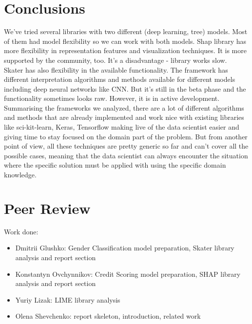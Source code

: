 \section{Conclusions}
We've tried several libraries with two different (deep learning, tree) models. Most of them had model flexibility so we can work with both models. 
Shap library has more flexibility in representation features and visualization techniques. It is more supported by the community, too. It's a disadvantage - library works slow. \\
Skater has also flexibility in the available functionality. The framework has different interpretation algorithms and methods available for different models including deep neural networks like CNN. But it's still in the beta phase and the functionality sometimes looks raw. However, it is in active development.
Summarising the frameworks we analyzed, there are a lot of different algorithms and methods that are already implemented and work nice with existing libraries like sci-kit-learn, Keras, Tensorflow making live of the data scientist easier and giving time to stay focused on the domain part of the problem. But from another point of view, all these techniques are pretty generic so far and can't cover all the possible cases, meaning that the data scientist can always encounter the situation where the specific solution must be applied with using the specific domain knowledge.

\section{Peer Review}
Work done:
\begin{itemize}
    \item Dmitrii Glushko: Gender Classification model preparation, Skater library analysis and report section
    \item Konstantyn Ovchynnikov: Credit Scoring model preparation, SHAP library analysis and report section
    \item Yuriy Lizak: LIME library analysis
    \item Olena Shevchenko: report skeleton, introduction, related work
\end{itemize}

\newpage
\printbibliography
